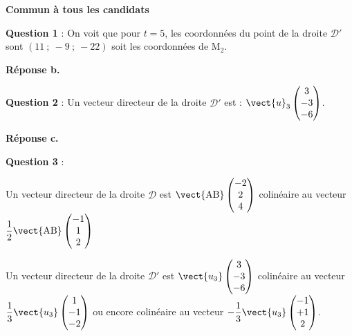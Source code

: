 \textbf{Commun à tous les candidats}

\medskip



























\textbf{Question 1} : 
On voit que pour $t = 5$, les coordonnées du point de la droite $\mathcal{D}'$ sont $(11~;~- 9~;~- 22)$ soit les coordonnées de M$_2$.

\smallskip

\hfill\textbf{Réponse b.}

\medskip

\textbf{Question 2} : Un vecteur directeur de la droite $\mathcal{D}'$ est : $\vect{u}_3\begin{pmatrix}3\\- 3\\-6\end{pmatrix}$.

\smallskip

\hfill\textbf{Réponse c.}

\medskip



\textbf{Question 3} : 






Un vecteur directeur de la droite $\mathcal{D}$ est $\vect{\text{AB}}\begin{pmatrix}-2\\2\\4\end{pmatrix}$ colinéaire au vecteur $\dfrac{1}{2}\vect{\text{AB}}\begin{pmatrix}-1\\1\\2\end{pmatrix}$

Un vecteur directeur de la droite $\mathcal{D}'$ est $\vect{u_3}\begin{pmatrix}3\\- 3\\-6\end{pmatrix}$ colinéaire au vecteur $\dfrac{1}{3}\vect{u_3}\begin{pmatrix}1\\- 1\\-2\end{pmatrix}$ ou encore colinéaire au vecteur $-\dfrac{1}{3}\vect{u_3}\begin{pmatrix}-1\\+ 1\\2\end{pmatrix}$.

